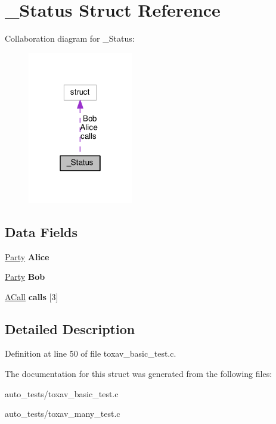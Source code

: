 \hypertarget{struct___status}{\section{\+\_\+\+Status Struct Reference}
\label{struct___status}
}


Collaboration diagram for \+\_\+\+Status\+:
\nopagebreak
\begin{figure}[H]
\begin{center}
\leavevmode
\includegraphics[width=130pt]{struct___status__coll__graph}
\end{center}
\end{figure}
\subsection*{Data Fields}
\begin{DoxyCompactItemize}
\item 
\hypertarget{struct___status_a0fd20957e107227630b542b146c276d4}{\hyperlink{struct___party}{Party} {\bfseries Alice}}\label{struct___status_a0fd20957e107227630b542b146c276d4}

\item 
\hypertarget{struct___status_a78cf423939bd332fd6e5ddae67134e01}{\hyperlink{struct___party}{Party} {\bfseries Bob}}\label{struct___status_a78cf423939bd332fd6e5ddae67134e01}

\item 
\hypertarget{struct___status_a2f6221bbb611e0d485e26cd2722bd7ee}{\hyperlink{struct___a_call}{A\+Call} {\bfseries calls} \mbox{[}3\mbox{]}}\label{struct___status_a2f6221bbb611e0d485e26cd2722bd7ee}

\end{DoxyCompactItemize}


\subsection{Detailed Description}


Definition at line 50 of file toxav\+\_\+basic\+\_\+test.\+c.



The documentation for this struct was generated from the following files\+:\begin{DoxyCompactItemize}
\item 
auto\+\_\+tests/toxav\+\_\+basic\+\_\+test.\+c\item 
auto\+\_\+tests/toxav\+\_\+many\+\_\+test.\+c\end{DoxyCompactItemize}
